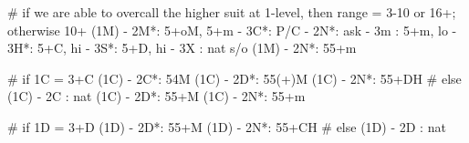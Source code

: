 # if we are able to overcall the higher suit at 1-level, then range = 3-10 or 16+; otherwise 10+
(1M) - 2M*: 5+oM, 5+m
          - 3C*: P/C
          - 2N*: ask
               - 3m : 5+m, lo
               - 3H*: 5+C, hi
               - 3S*: 5+D, hi
          - 3X : nat s/o
(1M) - 2N*: 55+m

# if 1C = 3+C
(1C) - 2C*: 54M
(1C) - 2D*: 55(+)M 
(1C) - 2N*: 55+DH
# else
(1C) - 2C : nat
(1C) - 2D*: 55+M
(1C) - 2N*: 55+m

# if 1D = 3+D
(1D) - 2D*: 55+M
(1D) - 2N*: 55+CH
# else
(1D) - 2D : nat 
